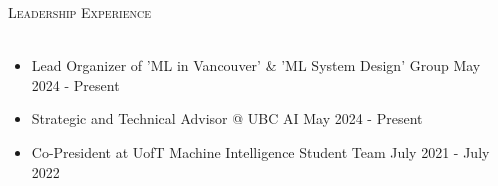 \documentclass[a4paper]{article}
\newcommand{\lineunder} {
    \vspace*{-8pt} \\
    \hspace*{-18pt} \hrulefill \\
}
\newcommand{\header} [1] {
    {\hspace*{-18pt}\vspace*{6pt} \textsc{#1}}
    \vspace*{-6pt} \lineunder
}
\begin{document}
\vspace{1mm}
\header{Leadership Experience}
\vspace{-3mm}
\begin{itemize} \itemsep 0.5pt
    \item \begin{normalsize} Lead Organizer of 'ML in Vancouver' \& 'ML System Design' Group \hfill May 2024 - Present \end{normalsize}
	\vspace{-2mm}
    \item \begin{normalsize} Strategic and Technical Advisor @ UBC AI \hfill May 2024 - Present \end{normalsize}
	\vspace{-2mm}
    \item \begin{normalsize} Co-President at UofT Machine Intelligence Student Team \hfill July 2021 - July 2022 \end{normalsize}
	\vspace{-2mm}
\end{itemize}
\end{document}

